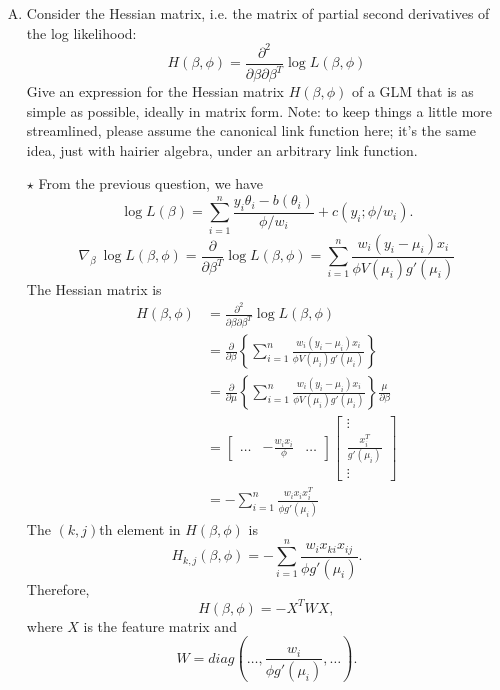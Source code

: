 \documentclass[11pt]{article}
\newcommand{\jie}{$\star$ }
\begin{document}
\begin{enumerate}[(A)]
\item Consider the Hessian matrix, i.e. the matrix of partial second derivatives of the log likelihood:  
$$
H(\beta, \phi) = \frac{\partial^2}{\partial \beta \partial \beta^T} \log L(\beta, \phi) 
$$
Give an expression for the Hessian matrix $H(\beta, \phi)$ of a GLM that is as simple as possible, ideally in matrix form.   Note: to keep things a little more streamlined, please assume the canonical link function here; it's the same idea, just with hairier algebra, under an arbitrary link function.  

\bigskip
\jie
From the previous question, we have
$$ \log L(\beta) = \sum_{i=1}^n \frac{y_i \theta_i - b(\theta_i)}{\phi/w_i} + c(y_i; \phi/w_i).$$
$$ \nabla_\beta \  \log L(\beta, \phi)  = \frac{\partial}{\partial \beta^T} \log L(\beta, \phi) = \sum_{i=1}^n \frac{w_i(y_i - \mu_i) x_i}{ \phi V(\mu_i) g'(\mu_i)}$$
The Hessian matrix is
\begin{align*}
    H(\beta, \phi) &= \frac{\partial^2}{\partial \beta \partial \beta^T} \log L(\beta, \phi) \\
    &= \frac{\partial}{\partial \beta} \left\{ \sum_{i=1}^n \frac{w_i(y_i - \mu_i) x_i}{ \phi V(\mu_i) g'(\mu_i)} \right\} \\
    &= \frac{\partial}{\partial \mu} \left\{ \sum_{i=1}^n \frac{w_i(y_i - \mu_i) x_i}{ \phi V(\mu_i) g'(\mu_i)} \right\} \frac{\mu}{\partial \beta} \\
    &= 
    \begin{bmatrix}
      \dots & -\frac{w_ix_i}{\phi} & \dots
    \end{bmatrix}
    \begin{bmatrix}
      \vdots \\
      \frac{x_i^T}{g'(\mu_i)} \\
      \vdots
    \end{bmatrix} \\
    & = - \sum_{i=1}^n \frac{w_i x_i x_i^T}{\phi g'(\mu_i)}
\end{align*}
The $(k,j)$th element in $H(\beta, \phi)$ is
$$H_{k,j}(\beta, \phi) = - \sum_{i=1}^n \frac{w_ix_{ki}x_{ij}}{\phi g'(\mu_i)} .$$
Therefore,
$$H(\beta,\phi) = - X^T W X,$$
where $X$ is the feature matrix and 
$$W = diag \left(\dots, \frac{w_i}{\phi g'(\mu_i)}, \dots \right).$$


\end{enumerate}
\end{document}

